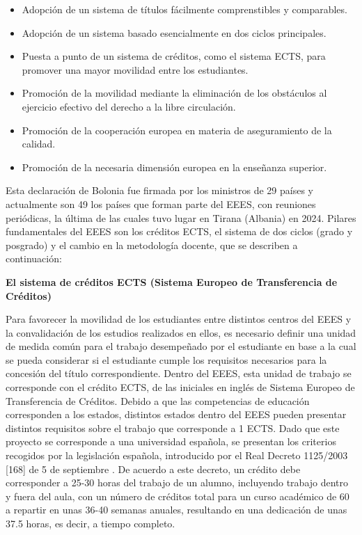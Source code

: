 \documentclass[a4paper,12pt,twoside]{article}
\begin{document}
\begin{itemize}
\item Adopción de un sistema de títulos fácilmente comprenstibles y comparables.
\item Adopción de un sistema basado esencialmente en dos ciclos principales.
\item Puesta a punto de un sistema de créditos, como el sistema ECTS, para promover una mayor movilidad entre los estudiantes.
\item Promoción de la movilidad mediante la eliminación de los obstáculos al ejercicio efectivo del derecho a la libre circulación.
\item Promoción de la cooperación europea en materia de aseguramiento de la calidad.
\item Promoción de la necesaria dimensión europea en la enseñanza superior.
\end{itemize}

Esta declaración de Bolonia fue firmada por los ministros de 29 países y actualmente son 49 los países que forman parte del EEES, con reuniones periódicas, la última de las cuales tuvo lugar en Tirana (Albania) en 2024. Pilares fundamentales del EEES son los créditos ECTS, el sistema de dos ciclos (grado y posgrado) y el cambio en la metodología docente, que se describen a continuación:

\textbf{El sistema de créditos ECTS (Sistema Europeo de Transferencia de Créditos)} 

Para favorecer la movilidad de los estudiantes entre distintos centros del EEES y la convalidación de los estudios realizados en ellos, es necesario definir una unidad de medida común para el trabajo desempeñado por el estudiante en base a la cual se pueda considerar si el estudiante cumple los requisitos necesarios para la concesión del título correspondiente. Dentro del EEES, esta unidad de trabajo se corresponde con el crédito ECTS, de las iniciales en inglés de Sistema Europeo de Transferencia de Créditos. Debido a que las competencias de educación corresponden a los estados, distintos estados dentro del EEES pueden presentar distintos requisitos sobre el trabajo que corresponde a 1 ECTS. Dado que este proyecto se corresponde a una universidad española, se presentan los criterios recogidos por la legislación española, introducido por el Real Decreto 1125/2003 [168] de 5 de septiembre \cite{dec_ects}. De acuerdo a este decreto, un crédito debe corresponder a 25-30 horas del trabajo de un alumno, incluyendo trabajo dentro y fuera del aula, con un número de créditos total para un curso académico de 60 a repartir en unas 36-40 semanas anuales, resultando en una dedicación de unas 37.5 horas, es decir, a tiempo completo.
\end{document}
